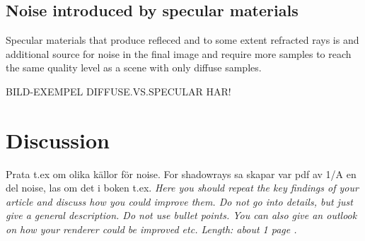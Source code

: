 \documentclass[]{report}   %
\begin{document}
\section{Noise introduced by specular materials}
Specular materials that produce refleced and to some extent refracted rays is and additional source for noise in the final image and require more samples to reach the same quality level as a scene with only diffuse samples.

BILD-EXEMPEL DIFFUSE.VS.SPECULAR HAR!
\chapter{Discussion}
Prata t.ex om olika källor för noise. For shadowrays sa skapar var pdf av 1/A en del noise, las om det i boken t.ex.
\emph{Here you should repeat the key findings of your article and discuss how you could improve them. 
Do not go into details, but just give a general description. 
Do not use bullet points. 
You can also give an outlook on how your renderer could be improved etc. 
Length: about 1 page .}



\end{document}
